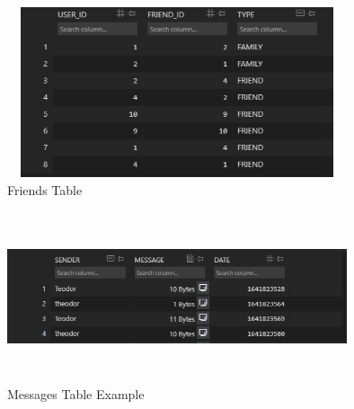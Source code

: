 \documentclass[runningheads, a4paper]{llncs}
\begin{document}
\begin{figure}
    \centering
    \includegraphics[width = 10cm, height = 5cm, keepaspectratio]{Friends.PNG}
    \caption{Friends Table}
\end{figure}
\begin{figure}
    \centering
    \includegraphics[width = 10cm, height = 5cm, keepaspectratio]{Capture.PNG}
    \caption{Messages Table Example}
\end{figure}
\newpage{}
\end{document}
